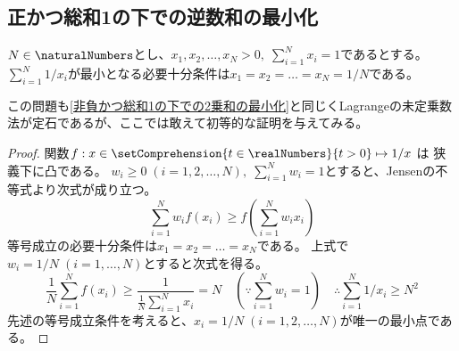         \subsection{正かつ総和1の下での逆数和の最小化}
            \begin{shadebox}
                $N\in\naturalNumbers$とし、$x_1,x_2,\dots,x_N > 0,\;\sum_{i=1}^N x_i = 1$であるとする。
                $\sum_{i=1}^N 1/x_i$が最小となる必要十分条件は$x_1 = x_2 = \dots = x_N = 1/N$である。
            \end{shadebox}
            この問題も\ref{非負かつ総和1の下での2乗和の最小化}と同じくLagrangeの未定乗数法が定石であるが、ここでは敢えて初等的な証明を与えてみる。
            \begin{proof}
                \quad\par
                関数$f:x\in\setComprehension{t\in\realNumbers}{t>0} \mapsto 1/x$ は 狭義下に凸である。
                $w_i\geq 0\;(i=1,2,\dots,N),\;\sum_{i=1}^N w_i = 1$とすると、Jensenの不等式より次式が成り立つ。
                \[ \sum_{i=1}^N w_i f(x_i) \geq f\left(\sum_{i=1}^N w_i x_i\right) \]
                等号成立の必要十分条件は$x_1 = x_2 = \dots = x_N$である。
                上式で$w_i = 1/N\;(i=1,\dots,N)$とすると次式を得る。
                \[ \frac{1}{N} \sum_{i=1}^N f(x_i) \geq \frac{1}{\frac{1}{N} \sum_{i=1}^N x_i} = N \quad \left(\because \sum_{i=1}^N w_i = 1\right) \quad \therefore \sum_{i=1}^N 1/x_i \geq N^2 \]
                先述の等号成立条件を考えると、$x_i = 1/N\;(i=1,2,\dots,N)$が唯一の最小点である。
            \end{proof}
